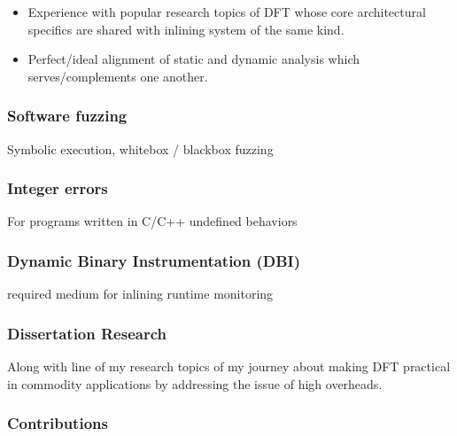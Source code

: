 \documentclass[letterpaper, 10pt]{article}
\begin{document}
\begin{small}
\begin{itemize}
    \item Experience with popular research topics of DFT whose core
    architectural specifics are shared with inlining system of the same
    kind. 
    \item Perfect/ideal alignment of static and dynamic analysis which
    serves/complements one another.  
\end{itemize}


\subsubsection*{Software fuzzing}
Symbolic execution, whitebox / blackbox fuzzing

\subsubsection*{Integer errors}
For programs written in C/C++ undefined behaviors

\subsubsection*{Dynamic Binary Instrumentation (DBI)}
required medium for inlining runtime monitoring 

\subsubsection*{Dissertation Research}
Along with line of my research topics of my journey about making DFT practical
in commodity applications by addressing the issue of high overheads.


\subsubsection*{Contributions}


\end{small}
\end{document}
